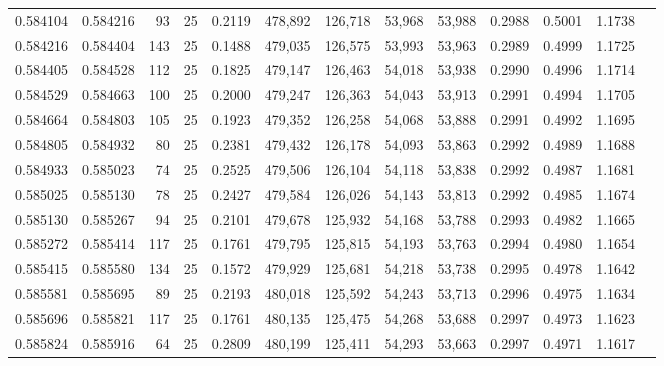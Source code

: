\begin{tabular}{rrrrrrrrrrrrr}
0.584104 & 0.584216 &    93 &  25 &                                     0.2119 & 478,892 & 126,718 &  53,968 &  53,988 & 0.2988 & 0.5001 & 1.1738 \\
0.584216 & 0.584404 &   143 &  25 &                                     0.1488 & 479,035 & 126,575 &  53,993 &  53,963 & 0.2989 & 0.4999 & 1.1725 \\
0.584405 & 0.584528 &   112 &  25 &                                     0.1825 & 479,147 & 126,463 &  54,018 &  53,938 & 0.2990 & 0.4996 & 1.1714 \\
0.584529 & 0.584663 &   100 &  25 &                                     0.2000 & 479,247 & 126,363 &  54,043 &  53,913 & 0.2991 & 0.4994 & 1.1705 \\
0.584664 & 0.584803 &   105 &  25 &                                     0.1923 & 479,352 & 126,258 &  54,068 &  53,888 & 0.2991 & 0.4992 & 1.1695 \\
0.584805 & 0.584932 &    80 &  25 &                                     0.2381 & 479,432 & 126,178 &  54,093 &  53,863 & 0.2992 & 0.4989 & 1.1688 \\
0.584933 & 0.585023 &    74 &  25 &                                     0.2525 & 479,506 & 126,104 &  54,118 &  53,838 & 0.2992 & 0.4987 & 1.1681 \\
0.585025 & 0.585130 &    78 &  25 &                                     0.2427 & 479,584 & 126,026 &  54,143 &  53,813 & 0.2992 & 0.4985 & 1.1674 \\
0.585130 & 0.585267 &    94 &  25 &                                     0.2101 & 479,678 & 125,932 &  54,168 &  53,788 & 0.2993 & 0.4982 & 1.1665 \\
0.585272 & 0.585414 &   117 &  25 &                                     0.1761 & 479,795 & 125,815 &  54,193 &  53,763 & 0.2994 & 0.4980 & 1.1654 \\
0.585415 & 0.585580 &   134 &  25 &                                     0.1572 & 479,929 & 125,681 &  54,218 &  53,738 & 0.2995 & 0.4978 & 1.1642 \\
0.585581 & 0.585695 &    89 &  25 &                                     0.2193 & 480,018 & 125,592 &  54,243 &  53,713 & 0.2996 & 0.4975 & 1.1634 \\
0.585696 & 0.585821 &   117 &  25 &                                     0.1761 & 480,135 & 125,475 &  54,268 &  53,688 & 0.2997 & 0.4973 & 1.1623 \\
0.585824 & 0.585916 &    64 &  25 &                                     0.2809 & 480,199 & 125,411 &  54,293 &  53,663 & 0.2997 & 0.4971 & 1.1617 \\

\end{tabular}
